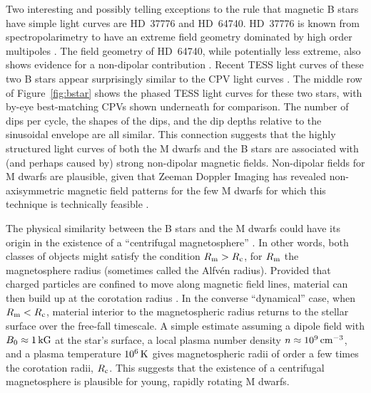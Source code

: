 \documentclass[11pt,twocolumn,tighten]{aastex63}
\begin{document}
Two interesting and possibly telling exceptions to the rule that
magnetic B stars have simple light curves are HD~37776 and HD~64740.
HD~37776 is known from spectropolarimetry to have an extreme field
geometry dominated by high order multipoles
\citep{2011ApJ...726...24K}.  The field geometry of HD~64740, while
potentially less extreme, also shows evidence for a non-dipolar
contribution \citep{2018MNRAS.475.5144S}.  Recent TESS light curves of
these two B stars appear surprisingly similar to the CPV light curves
\citep{2020pase.conf...46M}.  The middle row of Figure~\ref{fig:bstar}
shows the phased TESS light curves for these two stars, with by-eye
best-matching CPVs shown underneath for comparison.  The number of
dips per cycle, the shapes of the dips, and the dip depths relative to
the sinusoidal envelope are all similar.  This connection suggests
that the highly structured light curves of both the M dwarfs and the B
stars are associated with (and perhaps caused by) strong non-dipolar
magnetic fields.  Non-dipolar fields for M dwarfs are plausible, given
that Zeeman Doppler Imaging has revealed non-axisymmetric magnetic
field patterns for the few M dwarfs for which this technique is
technically feasible \citep[see][and references
therein]{2021A&ARv..29....1K}.


The physical similarity between the B stars and the M dwarfs could
have its origin in the existence of a ``centrifugal magnetosphere''
\citep[see][]{2013MNRAS.429..398P}.  In other words, both classes of
objects might satisfy the condition $R_{\rm m} > R_{\rm c}$, for
$R_{\rm m}$ the magnetosphere radius (sometimes called the Alfv\'en
radius).  Provided that charged particles are confined to move along
magnetic field lines, material can then build up at the corotation
radius \citep[e.g.][Sec.\ 4, and references
therein]{2015SSRv..191..339R}.  In the converse ``dynamical'' case,
when $R_{\rm m} < R_{\rm c}$, material interior to the magnetospheric
radius returns to the stellar surface over the free-fall timescale.  A
simple estimate assuming a dipole field with $B_0\approx1\,{\rm kG}$
at the star's surface, a local plasma number density
$n\approx10^9\,{\rm cm^{-3}}$, and a plasma temperature $10^6\,{\rm
K}$ gives magnetospheric radii of order a few times the corotation
radii, $R_{\rm c}$.  This suggests that the existence of a centrifugal
magnetosphere is plausible for young, rapidly rotating M dwarfs.


%
\end{document}
